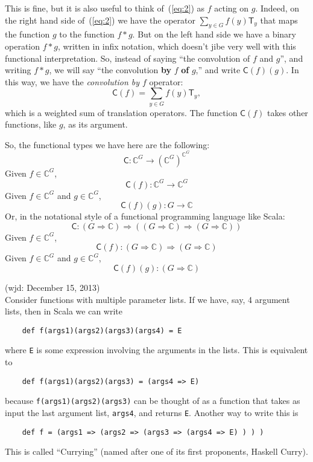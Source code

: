\documentclass[11pt]{article}
\newcommand\C{\ensuremath{\mathbb{C}}}
\newcommand{\lt}[1]{\ensuremath{\mathsf{#1}}}
\newcommand{\T}{\lt{T}}       %
\newcommand\conv{\lt{C}}
\begin{document}
 This is fine, but it is also useful to think of~(\ref{eq:2}) as $f$ acting
on $g$.  Indeed, on the right hand side of~(\ref{eq:2}) we have the operator 
$\sum_{y \in G} f(y) \T_y$ that maps the function $g$ to the function $f*g$.  But
on the left hand side we have a binary operation $f*g$, written in infix
notation, which doesn't jibe very well with this functional interpretation.  So,
instead of saying ``the convolution of $f$ and $g$'', and writing $f*g$, we will
say
``the convolution {\bf by} $f$ {\bf of} $g$,'' and write $\conv(f)(g)$. In this
way, we have the \emph{convolution by $f$} operator:
\begin{equation}
\label{eq:3}  
\conv(f) = \sum_{y \in G} f(y) \T_y,
\end{equation}
which is a weighted sum of translation operators.  The function $\conv(f)$ takes other
functions, like $g$, as its argument.

So, the functional types we have here are the following:
\[
\conv : \C^G \rightarrow (\C^G)^{\C^G}
\]
Given $f\in \C^G$,
\[
\conv(f) : \C^G \rightarrow \C^G
\]
Given $f\in \C^G$ and $g\in \C^G$,
\[
\conv(f)(g) : G \rightarrow \C
\]
Or, in the notational style of a functional programming language like Scala:
\[
\conv : (G \Rightarrow \C) \Rightarrow ( (G \Rightarrow \C) \Rightarrow (G \Rightarrow \C) )
\]
Given $f\in \C^G$,
\[
\conv(f) : (G \Rightarrow \C) \Rightarrow (G \Rightarrow \C)
\]
Given $f\in \C^G$ and $g\in \C^G$,
\[
\conv(f)(g) : (G \Rightarrow \C)
\]

\newpage

(wjd: December 15, 2013)\\[5pt]
Consider functions with multiple parameter lists. If we have, say, 4
argument lists, then in Scala we can write
{\small
\begin{verbatim}
    def f(args1)(args2)(args3)(args4) = E
\end{verbatim}}
\noindent where {\tt E} is some expression involving the arguments in the lists.
This is equivalent to
{\small
\begin{verbatim}
    def f(args1)(args2)(args3) = (args4 => E)
\end{verbatim}}
\noindent because {\tt f(args1)(args2)(args3)} can be thought of as a function that takes
as input the last argument list, {\tt args4}, and returns {\tt E}.
Another way to write this is
{\small
\begin{verbatim}
    def f = (args1 => (args2 => (args3 => (args4 => E) ) ) )
\end{verbatim}}
\noindent This is called ``Currying'' (named after one of its first proponents, Haskell Curry).
  
\end{document}

